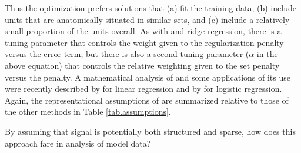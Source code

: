 

Thus the optimization prefers solutions that (a) fit the training data, (b) include units that are anatomically situated in similar sets, and (c) include a relatively small proportion of the units overall.  As with {\lasso} and ridge regression, there is a tuning parameter that controls the weight given to the regularization penalty versus the error term; but there is also a second tuning parameter ($\alpha$ in the above equation) that controls the relative weighting given to the set penalty versus the {\lasso} penalty.  A mathematical analysis of {\soslasso} and some applications of its use were recently described by  for linear regression and by  for logistic regression. Again, the representational assumptions of {\soslasso} are summarized relative to those of the other methods in Table \ref{tab.assumptions}.

By assuming that signal is potentially both structured and sparse, how does this approach fare in analysis of model data?

